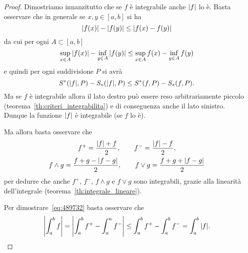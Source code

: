 \begin{proof}
Dimostriamo innanzitutto che se $f$ è integrabile anche ${\left|f\right|}$ lo è.
Basta osservare che in generale se $x,y\in [a,b]$ si ha
\[
  {\left|f(x)\right|}-{\left|f(y)\right|} \le {\left|f(x) - f(y)\right|}
\]
da cui per ogni $A\subset [a,b]$
\[
  \sup_{x\in A} {\left|f(x)\right|} - \inf_{y\in A} {\left|f(y)\right|} \le
  \sup_{x\in A} f(x) - \inf_{y\in A}f(y)
\]
e quindi per ogni suddivisione $P$ si avrà
\[
  S^*({\left|f\right|},P) - S_*({\left|f\right|}, P) \le S^*(f,P) - S_*(f,P).
\]
Ma se $f$ è integrabile allora il lato destro può essere reso
arbitrariamente piccolo (teorema~\ref{th:criteri_integrabilita})
e di conseguenza anche il lato sinistro.
Dunque la funzione ${\left|f\right|}$ è integrabile (se $f$ lo è).

Ma allora basta osservare che
\begin{gather*}
  f^+ = \frac{{\left|f\right|} + f}{2}, \qquad
  f^- = \frac{{\left|f\right|} - f}{2}, \\
  f\wedge g = \frac{f + g - {\left|f-g\right|}}{2}, \qquad
  f\vee g = \frac{f+g + {\left|f-g\right|}}{2}
\end{gather*}
per dedurre che anche $f^+$, $f^-$, $f\wedge g$ e $f\vee g$
sono integrabili,
 grazie
alla linearità dell'integrale (teorema~\ref{th:integrale_lineare}).

Per dimostrare~\eqref{eq:489732} basta osservare che 
\[
{\left|\int_a^b f\right|} = {\left|\int_a^b f^+ - \int_a^n f^-\right|}
\le \int_a^b f^+ - \int_a^b f^- = \int_a^b {\left|f\right|}.   
\]
\end{proof}

